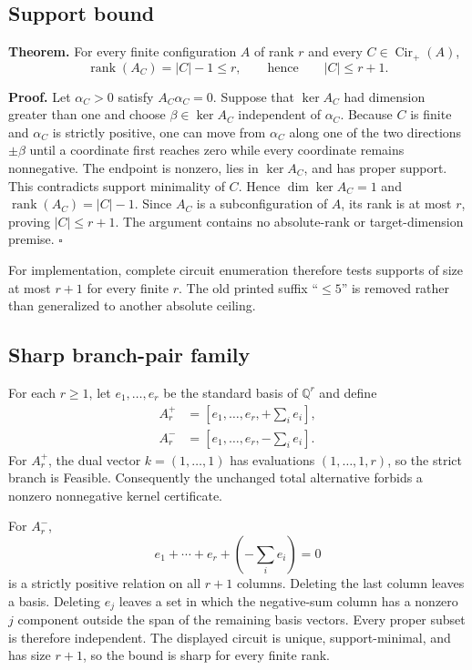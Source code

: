\documentclass[11pt]{article}
\newcommand{\Q}{\mathbb{Q}}
\newcommand{\Cirp}{\operatorname{Cir}_{+}}
\begin{document}
\subsection{Support bound}

\textbf{Theorem.}  For every finite configuration $A$ of rank $r$ and every
$C\in\Cirp(A)$,
\[
 \operatorname{rank}(A_C)=|C|-1\le r,
 \qquad\text{hence}\qquad |C|\le r+1.
\]

\textbf{Proof.}  Let $\alpha_C>0$ satisfy $A_C\alpha_C=0$.  Suppose that
$\ker A_C$ had dimension greater than one and choose
$\beta\in\ker A_C$ independent of $\alpha_C$.  Because $C$ is finite and
$\alpha_C$ is strictly positive, one can move from $\alpha_C$ along one of the
two directions $\pm\beta$ until a coordinate first reaches zero while every
coordinate remains nonnegative.  The endpoint is nonzero, lies in
$\ker A_C$, and has proper support.  This contradicts support minimality of
$C$.  Hence $\dim\ker A_C=1$ and
$\operatorname{rank}(A_C)=|C|-1$.  Since $A_C$ is a subconfiguration of $A$,
its rank is at most $r$, proving $|C|\le r+1$.  The argument contains no
absolute-rank or target-dimension premise.  \hfill$\square$

For implementation, complete circuit enumeration therefore tests supports of
size at most $r+1$ for every finite $r$.  The old printed suffix
``$\le5$'' is removed rather than generalized to another absolute ceiling.

\subsection{Sharp branch-pair family}

For each $r\ge1$, let $e_1,\ldots,e_r$ be the standard basis of $\Q^r$ and
define
\begin{align*}
 A_r^+&=[e_1,\ldots,e_r,+\textstyle\sum_i e_i],\\
 A_r^-&=[e_1,\ldots,e_r,-\textstyle\sum_i e_i].
\end{align*}
For $A_r^+$, the dual vector $k=(1,\ldots,1)$ has evaluations
$(1,\ldots,1,r)$, so the strict branch is Feasible.  Consequently the
unchanged total alternative forbids a nonzero nonnegative kernel certificate.

For $A_r^-$,
\[
 e_1+\cdots+e_r+\left(-\sum_i e_i\right)=0
\]
is a strictly positive relation on all $r+1$ columns.  Deleting the last
column leaves a basis.  Deleting $e_j$ leaves a set in which the negative-sum
column has a nonzero $j$ component outside the span of the remaining basis
vectors.  Every proper subset is therefore independent.  The displayed
circuit is unique, support-minimal, and has size $r+1$, so the bound is sharp
for every finite rank.
\end{document}
